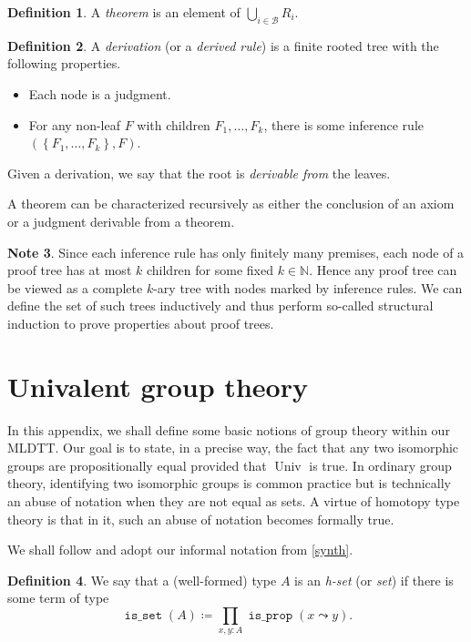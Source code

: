 \documentclass[10pt,letterpaper,cm]{nupset}
\theoremstyle{definition}
\newtheorem{definition}{Definition}[subsection]
\newtheorem{note}[definition]{Note}
\theoremstyle{theorem}
\theoremstyle{remark}
\newcommand{\0}{\mathbf{0}}
\newcommand{\1}{\mathbf{1}}
\newcommand{\2}{\mathbf{2}}
\DeclareMathOperator{\isprop}{\mathtt{is\_prop}}
\DeclareMathOperator{\isset}{\mathtt{is\_set}}
\DeclareMathOperator{\univ}{\mathrm{Univ}}
\newcommand{\N}{\mathbb N}
\newcommand{\bi}{\begin{itemize}}
\newcommand{\ei}{\end{itemize}}
\begin{document}
\begin{definition}
A \textit{theorem} is an element of $\bigcup_{i\in \mathcal{B}}R_i$.
\end{definition}

\begin{definition}
A \textit{derivation} (or a \textit{derived rule}) is a finite rooted tree with the following properties.
\bi
\item Each node is a judgment.
\item For any non-leaf $F$ with children $F_1, \ldots, F_k$, there is some inference rule $\left(\left\{F_1, \ldots, F_k\right\}, F\right)$.
\ei
\end{definition}
Given a derivation, we say that the root  is \textit{derivable from} the leaves.

\medskip

A theorem can be characterized recursively as either the conclusion of an axiom or a judgment derivable from a theorem.  

\begin{note}
Since each inference rule has only finitely many premises, each node of a proof tree has at most $k$ children for some fixed $k \in \N$. Hence any proof tree can be viewed as a complete $k$-ary tree with nodes marked by inference rules. We can define the set of such trees inductively and thus perform so-called structural induction to prove properties about proof trees.
\end{note}

\section{Univalent group theory}\label{groups}

In this appendix, we shall define some basic notions of group theory within our MLDTT. Our goal is to state, in a precise way, the fact that any two isomorphic groups are propositionally equal provided that $\univ$ is true.  In ordinary group theory, identifying two isomorphic groups  is common practice  but is technically an abuse of notation when they are not equal as sets. A virtue of homotopy type theory is that in it, such an abuse of notation becomes formally true.

\medskip
We shall follow \cite[Section 11.2]{Rijke} and adopt  our informal notation from \cref{synth}.

\bigskip

\begin{definition}
We say that a (well-formed) type $A$ is an \textit{h-set} (or \textit{set}) if there is some term of type $$ \isset(A) \coloneqq \prod_{x,y:A}\isprop(x\leadsto y)    .$$ 
\end{definition}
\end{document}
